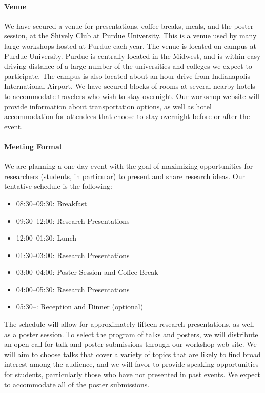 \documentclass[11pt]{article}
\newcommand{\parahead}[1]{\paragraph{#1}}
\begin{document}
\parahead{Venue}

We have secured a venue for presentations, coffee breaks, meals, and the poster session, at the Shively Club at Purdue University. This is a venue used by many large workshops hosted at Purdue each year. The venue is located on campus at Purdue University. Purdue is centrally located in the Midwest, and is within easy driving distance of a large number of the universities and colleges we expect to participate. The campus is also located about an hour drive from Indianapolis International Airport. We have secured blocks of rooms at several nearby hotels to accommodate travelers who wish to stay overnight. Our
workshop website will provide information about transportation
options, as well as hotel accommodation for attendees that choose to
stay overnight before or after the event.

\parahead{Meeting Format}

We are planning a one-day event with the goal of maximizing
opportunities for researchers (students, in particular) to
present and share research ideas. Our tentative schedule is the
following:

\begin{itemize}
\item 08:30--09:30: Breakfast
\item 09:30--12:00: Research Presentations
\item 12:00--01:30: Lunch
\item 01:30--03:00: Research Presentations
\item 03:00--04:00: Poster Session and Coffee Break
\item 04:00--05:30: Research Presentations
\item 05:30--: Reception and Dinner (optional)
\end{itemize}


\noindent
The schedule will allow for approximately fifteen research
presentations, as well as a poster session.
To select the program of talks and posters, we will distribute an open
call for talk and poster submissions through our workshop web site. We
will aim to choose talks that cover a variety of topics that are
likely to find broad interest among the audience, and we will favor
to provide speaking opportunities for students, particularly those who have
not presented in past events. We expect to accommodate all of the poster
submissions.
\end{document}
